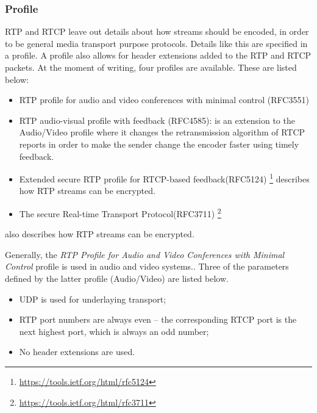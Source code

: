\subsubsection{Profile} \label{sec:design:profile}
RTP and RTCP leave out details about how streams should be encoded, in order to be general media transport purpose protocols. Details like this are specified in a profile. A profile also allows for header extensions added to the RTP and RTCP packets.
At the moment of writing, four profiles are available. These are listed below:
\begin{itemize}
	\item RTP profile for audio and video conferences with minimal control (RFC3551)
	
	\item RTP audio-visual profile with feedback (RFC4585):  is an extension to the Audio/Video profile where it changes the retransmission algorithm of RTCP reports in order to make the sender change the encoder faster using timely feedback.
	
	\item Extended secure RTP profile for RTCP-based feedback(RFC5124) \footnote{\url{https://tools.ietf.org/html/rfc5124}} describes how RTP streams can be encrypted.
	 
	\item The secure Real-time Transport Protocol(RFC3711) \footnote{\url{https://tools.ietf.org/html/rfc3711}}
\end{itemize} \citep{johnston2004sip} also describes how RTP streams can be encrypted.


\noindent  Generally, the \textit{RTP Profile for Audio and Video Conferences with Minimal Control} profile is used in audio and video systems.\citep{perkins2003rtp}.
Three of the parameters defined by the latter profile (Audio/Video) are listed below\citep{johnston2004sip}.
\begin{itemize}
	\item UDP is used for underlaying transport;
	\item RTP port numbers are always even -- the corresponding RTCP port is the next highest port, which is always an odd number;
	\item No header extensions are used.
\end{itemize} 


